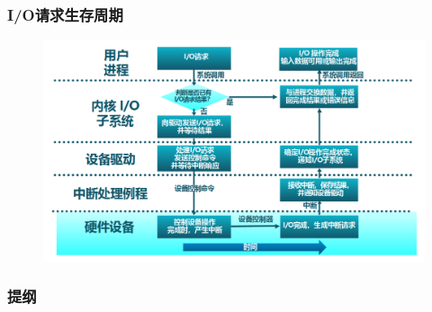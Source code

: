\begin{frame}[fragile]
    \frametitle{I/O请求生存周期}
    \begin{figure}
        \includegraphics[width=0.8\linewidth]{figs/os-io-lifetime.png}
    \end{figure}
\end{frame}
\begin{frame}
\frametitle{提纲} %
\tableofcontents %


\end{frame}
